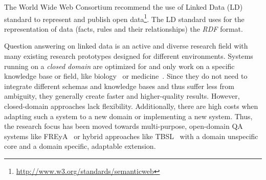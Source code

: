 The World Wide Web Consortium recommend the use of Linked Data (LD) standard to represent and publish open data\footnote{\url{http://www.w3.org/standards/semanticweb}}.
The LD standard uses for the representation of data (facts, rules and their relationships) the \emph{RDF} format.

Question answering on linked data is an active and diverse research field with many existing research prototypes designed for different environments.
Systems running on a \emph{closed domain} are optimized for and only work on a specific knowledge base or field, like biology~\cite{biomedicalqa} or medicine~\cite{medicalqa}.
Since they do not need to integrate different schemas and knowledge bases and thus suffer less from ambiguity, they generally create faster and higher-quality results.
However, closed-domain approaches lack flexibility.
Additionally, there are high costs when adapting such a system to a new domain or implementing a new system.
Thus, the research focus has been moved towards multi-purpose, open-domain QA systems like FREyA~\cite{freya} or hybrid approaches like TBSL~\cite{unger2012template} with a domain unspecific core and a domain specific, adaptable extension.

